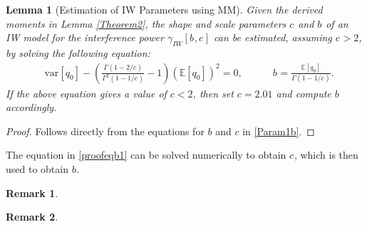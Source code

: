 \documentclass[12pt, draftclsnofoot, onecolumn]{IEEEtran}
\newtheorem{MomentsLemma}{Lemma}
\newtheorem{remark}{Remark}
\theoremstyle{plain}
\begin{document}
%
%
%
%
%
%
\begin{MomentsLemma}[Estimation of IW Parameters using MM] \label{Lemma2b}
Given the derived moments in Lemma \ref{Theorem2}, the shape and scale parameters ${{c_{}}}$ and $b_{}$ of an IW model for the interference power $\gamma_{IW}[{{b_{}}},{{c_{}}}]$ can be estimated, assuming ${{c_{}}}>2$, by solving the following equation:
\begin{align}\label{proofeqb1}
&\text{var}[\mathit{q}_{0}]-\left(\frac{\Gamma(1-2/{{c_{}}})}{\Gamma^2(1-1/{{c_{}}})}-1 \right) \left(\mathbb{E}[\mathit{q}_{0}]\right)^2=0, \quad \quad \quad %
{{b_{}}}=\frac{\mathbb{E}[\mathit{q}_{0}]}{\Gamma(1-1/{{c_{}}})}. %
\end{align} 
If the above equation gives a value of $c < 2$, then set $c = 2.01$ and compute $b$ accordingly.
\end{MomentsLemma}
%
\vspace{-.1in}
\begin{proof}
Follows directly from the equations for $b$ and $c$ in \eqref{Param1b}.
\end{proof}
The equation in \eqref{proofeqb1} can be solved numerically to obtain ${{c_{}}}$, which is then used %
to obtain ${{b_{}}}$.
%
%
\begin{remark}
\end{remark}  
%
\begin{remark}
\end{remark} 
%
\vspace{-.1in}
\end{document}
